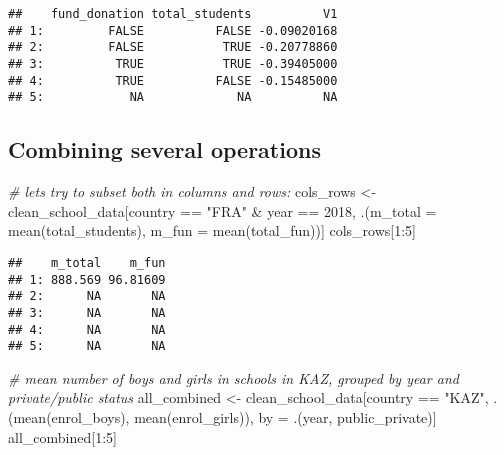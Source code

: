 \documentclass[
]{article}
\newenvironment{Shaded}{\begin{snugshade}}{\end{snugshade}}
\newcommand{\AttributeTok}[1]{\textcolor[rgb]{0.77,0.63,0.00}{#1}}
\newcommand{\CommentTok}[1]{\textcolor[rgb]{0.56,0.35,0.01}{\textit{#1}}}
\newcommand{\DecValTok}[1]{\textcolor[rgb]{0.00,0.00,0.81}{#1}}
\newcommand{\FunctionTok}[1]{\textcolor[rgb]{0.00,0.00,0.00}{#1}}
\newcommand{\NormalTok}[1]{#1}
\newcommand{\OtherTok}[1]{\textcolor[rgb]{0.56,0.35,0.01}{#1}}
\newcommand{\SpecialCharTok}[1]{\textcolor[rgb]{0.00,0.00,0.00}{#1}}
\newcommand{\StringTok}[1]{\textcolor[rgb]{0.31,0.60,0.02}{#1}}
\begin{document}
\begin{verbatim}
##    fund_donation total_students          V1
## 1:         FALSE          FALSE -0.09020168
## 2:         FALSE           TRUE -0.20778860
## 3:          TRUE           TRUE -0.39405000
## 4:          TRUE          FALSE -0.15485000
## 5:            NA             NA          NA
\end{verbatim}

\hypertarget{combining-several-operations}{%
\subsection{Combining several
operations}\label{combining-several-operations}}

\begin{Shaded}
\begin{Highlighting}[]
\CommentTok{\# let\textquotesingle{}s try to subset both in columns and rows:}
\NormalTok{cols\_rows }\OtherTok{\textless{}{-}}\NormalTok{ clean\_school\_data[country }\SpecialCharTok{==} \StringTok{"FRA"} \SpecialCharTok{\&}\NormalTok{ year }\SpecialCharTok{==} \DecValTok{2018}\NormalTok{,}
\NormalTok{               .(}\AttributeTok{m\_total =} \FunctionTok{mean}\NormalTok{(total\_students), }\AttributeTok{m\_fun =} \FunctionTok{mean}\NormalTok{(total\_fun))]}
\NormalTok{cols\_rows[}\DecValTok{1}\SpecialCharTok{:}\DecValTok{5}\NormalTok{]}
\end{Highlighting}
\end{Shaded}

\begin{verbatim}
##    m_total    m_fun
## 1: 888.569 96.81609
## 2:      NA       NA
## 3:      NA       NA
## 4:      NA       NA
## 5:      NA       NA
\end{verbatim}

\begin{Shaded}
\begin{Highlighting}[]
\CommentTok{\# mean number of boys and girls in schools in KAZ, grouped by year and private/public status }
\NormalTok{all\_combined }\OtherTok{\textless{}{-}}\NormalTok{ clean\_school\_data[country }\SpecialCharTok{==} \StringTok{"KAZ"}\NormalTok{,}
\NormalTok{        .(}\FunctionTok{mean}\NormalTok{(enrol\_boys), }\FunctionTok{mean}\NormalTok{(enrol\_girls)),}
\NormalTok{        by }\OtherTok{=}\NormalTok{ .(year, public\_private)]}
\NormalTok{all\_combined[}\DecValTok{1}\SpecialCharTok{:}\DecValTok{5}\NormalTok{]}
\end{Highlighting}
\end{Shaded}
\end{document}
